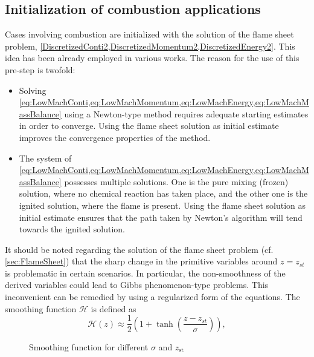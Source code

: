 \subsection{Initialization of combustion applications}\label{ssec:MethodCombustion}
Cases involving combustion are initialized with the solution of the flame sheet problem, \cref{DiscretizedConti2,DiscretizedMomentum2,DiscretizedEnergy2}. This idea has been already employed in various works. \textcite{smookeNumericalSolutionTwoDimensional1986,smookeNumericalModelingAxisymmetric1992} The reason for the use of this pre-step is twofold:
\begin{itemize}
	\item Solving \cref{eq:LowMachConti,eq:LowMachMomentum,eq:LowMachEnergy,eq:LowMachMassBalance} using a Newton-type method requires adequate starting estimates in order to converge. Using the flame sheet solution as initial estimate improves the convergence properties of the method.
	\item The system of  \cref*{eq:LowMachConti,eq:LowMachMomentum,eq:LowMachEnergy,eq:LowMachMassBalance} possesses multiple solutions. One is the pure mixing (frozen) solution, where no chemical reaction has taken place, and the other one is the ignited solution, where the flame is present. Using the flame sheet solution as initial estimate ensures that the path taken by Newton's algorithm will tend towards the ignited solution.
\end{itemize}

It should be noted regarding the solution of the flame sheet problem (cf. \cref{sec:FlameSheet}) that the sharp change in the primitive variables around $z = z_{st}$  is problematic in certain scenarios. In particular, the non-smoothness of the derived variables could lead to Gibbs phenomenon-type problems. This inconvenient can be remedied by using a regularized form of the equations. The smoothing function $\mathcal{H}$ is defined as
\begin{equation}\label{eq:regularization_MF}
	\mathcal{H}(z) \approx \frac{1}{2}(1+\tanh(\frac{z - z_{st} }{\sigma} )),
\end{equation}

\begin{figure}[t]
	\centering
	\caption{Smoothing function for different $\sigma$ and $z_{\text{st}}$}\label{fig:SmoothingFunc}
\end{figure}

